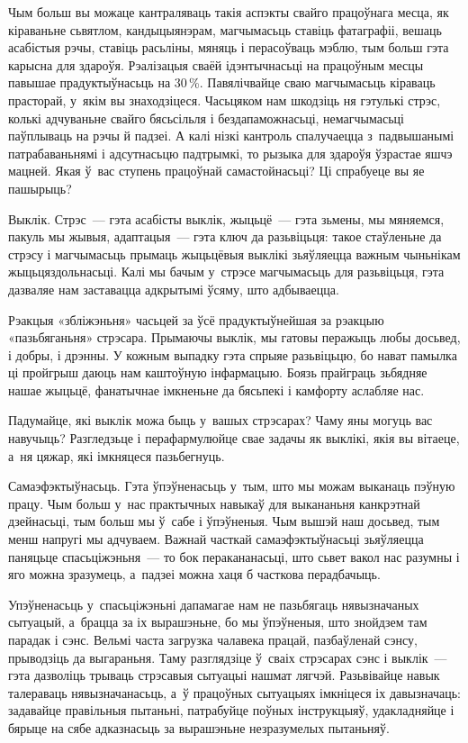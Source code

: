 Чым больш вы можаце кантраляваць такія аспэкты свайго працоўнага месца, як кіраваньне сьвятлом, кандыцыянэрам, магчымасьць ставіць фатаграфіі, вешаць асабістыя рэчы, ставіць расьліны, мяняць і перасоўваць мэблю, тым больш гэта карысна для здароўя. Рэалізацыя сваёй ідэнтычнасьці на працоўным месцы павышае прадуктыўнасьць на 30\,\%. Павялічвайце сваю магчымасьць кіраваць прасторай, у~якім вы знаходзіцеся. Часьцяком нам шкодзіць ня гэтулькі стрэс, колькі адчуваньне свайго бясьсільля і бездапаможнасьці, немагчымасьці паўплываць на рэчы й падзеі. А калі нізкі кантроль спалучаецца з~падвышанымі патрабаваньнямі і адсутнасьцю падтрымкі, то рызыка для здароўя ўзрастае яшчэ мацней. Якая ў~вас ступень працоўнай самастойнасьці? Ці спрабуеце вы яе пашырыць?

Выклік. Стрэс~--- гэта асабісты выклік, жыцьцё~--- гэта зьмены, мы мяняемся, пакуль мы жывыя, адаптацыя~--- гэта ключ да разьвіцьця: такое стаўленьне да стрэсу і магчымасьць прымаць жыцьцёвыя выклікі зьяўляецца важным чыньнікам жыцьцяздольнасьці. Калі мы бачым у~стрэсе магчымасьць для разьвіцьця, гэта дазваляе нам заставацца адкрытымі ўсяму, што адбываецца.

Рэакцыя «збліжэньня» часьцей за ўсё прадуктыўнейшая за рэакцыю «пазьбяганьня» стрэсара. Прымаючы выклік, мы гатовы перажыць любы досьвед, і добры, і дрэнны. У кожным выпадку гэта спрыяе разьвіцьцю, бо нават памылка ці пройгрыш даюць нам каштоўную інфармацыю. Боязь прайграць зьбядняе нашае жыцьцё, фанатычнае імкненьне да бясьпекі і камфорту аслабляе нас.

Падумайце, які выклік можа быць у~вашых стрэсарах? Чаму яны могуць вас навучыць? Разгледзьце і перафармулюйце свае задачы як выклікі, якія вы вітаеце, а~ня цяжар, які імкняцеся пазьбегнуць.

Самаэфэктыўнасьць. Гэта ўпэўненасьць у~тым, што мы можам выканаць пэўную працу. Чым больш у~нас практычных навыкаў для выкананьня канкрэтнай дзейнасьці, тым больш мы ў~сабе і ўпэўненыя. Чым вышэй наш досьвед, тым менш напругі мы адчуваем. Важнай часткай самаэфэктыўнасьці зьяўляецца паняцьце спасьціжэньня~--- то бок перакананасьці, што сьвет вакол нас разумны і яго можна зразумець, а~падзеі можна хаця б часткова перадбачыць. 

Упэўненасьць у~спасьціжэньні дапамагае нам не пазьбягаць нявызначаных сытуацый, а~брацца за іх вырашэньне, бо мы ўпэўненыя, што знойдзем там парадак і сэнс. Вельмі часта загрузка чалавека працай, пазбаўленай сэнсу, прыводзіць да выгараньня. Таму разглядзіце ў~сваіх стрэсарах сэнс і выклік~--- гэта дазволіць трываць стрэсавыя сытуацыі нашмат лягчэй. Разьвівайце навык талераваць нявызначанасьць, а~ў працоўных сытуацыях імкніцеся іх давызначаць: задавайце правільныя пытаньні, патрабуйце поўных інструкцыяў, удакладняйце і бярыце на сябе адказнасьць за вырашэньне незразумелых пытаньняў.

